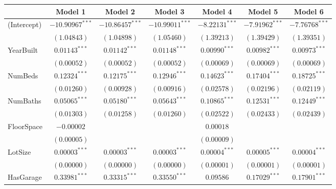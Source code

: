 
\begin{table}
\begin{center}
\begin{footnotesize}
\begin{tabular}{l c c c c c c}
\hline
 & Model 1 & Model 2 & Model 3 & Model 4 & Model 5 & Model 6 \\
\hline
(Intercept)  & $-10.90967^{***}$ & $-10.86457^{***}$ & $-10.99011^{***}$ & $-8.22131^{***}$ & $-7.91962^{***}$ & $-7.76768^{***}$ \\
             & $(1.04843)$       & $(1.04898)$       & $(1.05460)$       & $(1.39213)$      & $(1.39429)$      & $(1.39351)$      \\
YearBuilt    & $0.01143^{***}$   & $0.01142^{***}$   & $0.01148^{***}$   & $0.00990^{***}$  & $0.00982^{***}$  & $0.00973^{***}$  \\
             & $(0.00052)$       & $(0.00052)$       & $(0.00052)$       & $(0.00069)$      & $(0.00069)$      & $(0.00069)$      \\
NumBeds      & $0.12324^{***}$   & $0.12175^{***}$   & $0.12946^{***}$   & $0.14623^{***}$  & $0.17404^{***}$  & $0.18725^{***}$  \\
             & $(0.01260)$       & $(0.00928)$       & $(0.00916)$       & $(0.02578)$      & $(0.02196)$      & $(0.02119)$      \\
NumBaths     & $0.05065^{***}$   & $0.05180^{***}$   & $0.05643^{***}$   & $0.10865^{***}$  & $0.12531^{***}$  & $0.12449^{***}$  \\
             & $(0.01303)$       & $(0.01258)$       & $(0.01260)$       & $(0.02522)$      & $(0.02433)$      & $(0.02439)$      \\
FloorSpace   & $-0.00002$        &                   &                   & $0.00018$        &                  &                  \\
             & $(0.00005)$       &                   &                   & $(0.00009)$      &                  &                  \\
LotSize      & $0.00003^{***}$   & $0.00003^{***}$   & $0.00003^{***}$   & $0.00004^{***}$  & $0.00005^{***}$  & $0.00004^{***}$  \\
             & $(0.00000)$       & $(0.00000)$       & $(0.00000)$       & $(0.00001)$      & $(0.00001)$      & $(0.00001)$      \\
HasGarage    & $0.33981^{***}$   & $0.33315^{***}$   & $0.33550^{***}$   & $0.09586$        & $0.17029^{***}$  & $0.17901^{***}$  \\

\end{tabular}
\end{footnotesize}
\end{center}
\end{table}
